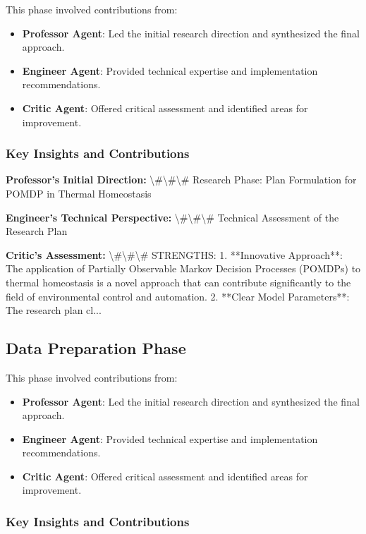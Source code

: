 \documentclass[11pt,a4paper]{article}
\begin{document}
This phase involved contributions from:

\begin{itemize}
\item \textbf{Professor Agent}: Led the initial research direction and synthesized the final approach.
\item \textbf{Engineer Agent}: Provided technical expertise and implementation recommendations.
\item \textbf{Critic Agent}: Offered critical assessment and identified areas for improvement.
\end{itemize}

\subsubsection{Key Insights and Contributions}


\textbf{Professor's Initial Direction:} \textbackslash{}#\textbackslash{}#\textbackslash{}# Research Phase: Plan Formulation for POMDP in Thermal Homeostasis


\textbf{Engineer's Technical Perspective:} \textbackslash{}#\textbackslash{}#\textbackslash{}# Technical Assessment of the Research Plan


\textbf{Critic's Assessment:} \textbackslash{}#\textbackslash{}#\textbackslash{}# STRENGTHS:
1. **Innovative Approach**: The application of Partially Observable Markov Decision Processes (POMDPs) to thermal homeostasis is a novel approach that can contribute significantly to the field of environmental control and automation.
2. **Clear Model Parameters**: The research plan cl...


\subsection{Data Preparation Phase}


This phase involved contributions from:

\begin{itemize}
\item \textbf{Professor Agent}: Led the initial research direction and synthesized the final approach.
\item \textbf{Engineer Agent}: Provided technical expertise and implementation recommendations.
\item \textbf{Critic Agent}: Offered critical assessment and identified areas for improvement.
\end{itemize}

\subsubsection{Key Insights and Contributions}
\end{document}
